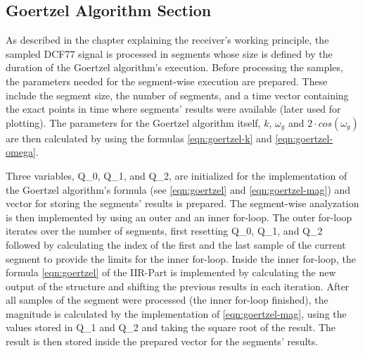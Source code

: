 \documentclass[conference]{IEEEtran}
\begin{document}
\subsection{Goertzel Algorithm Section}
As described in the chapter explaining the receiver's working principle, the sampled DCF77 signal is processed in segments whose size is defined by the duration of the Goertzel algorithm's execution.
Before processing the samples, the parameters needed for the segment-wise execution are prepared.
These include the segment size, the number of segments, and a time vector containing the exact points in time where segments' results were available (later used for plotting).
The parameters for the Goertzel algorithm itself, $k$, $\omega_{g}$ and $2 \cdot cos(\omega_{g})$ are then calculated by using the formulas \eqref{eqn:goertzel-k} and \eqref{eqn:goertzel-omega}.
\par
Three variables, Q\_0, Q\_1, and Q\_2, are initialized for the implementation of the Goertzel algorithm's formula (see \eqref{eqn:goertzel} and \eqref{eqn:goertzel-mag}) and vector for storing the segments' results is prepared.
The segment-wise analyzation is then implemented by using an outer and an inner for-loop.
The outer for-loop iterates over the number of segments, first resetting Q\_0, Q\_1, and Q\_2 followed by calculating the index of the first and the last sample of the current segment to provide the limits for the inner for-loop.
Inside the inner for-loop, the formula \eqref{eqn:goertzel} of the IIR-Part is implemented by calculating the new output of the structure and shifting the previous results in each iteration.
After all samples of the segment were processed (the inner for-loop finished), the magnitude is calculated by the implementation of \eqref{eqn:goertzel-mag}, using the values stored in Q\_1 and Q\_2 and taking the square root of the result.
The result is then stored inside the prepared vector for the segments' results.
\end{document}
